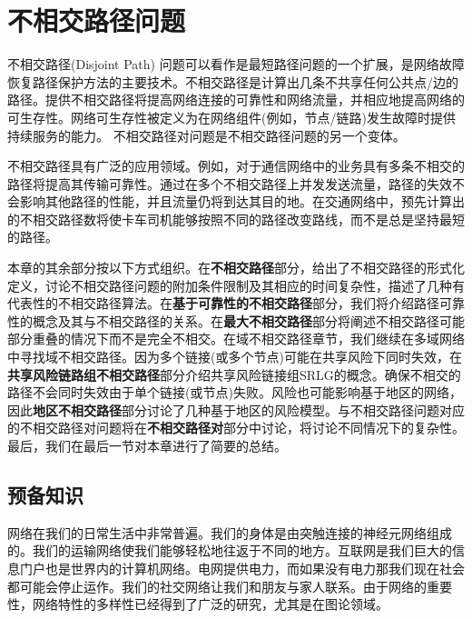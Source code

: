 \chapter{不相交路径问题}


不相交路径(Disjoint Path) 问题可以看作是最短路径问题的一个扩展，是网络故障恢复路径保护方法的主要技术。不相交路径是计算出几条不共享任何公共点/边的路径。提供不相交路径将提高网络连接的可靠性和网络流量，并相应地提高网络的可生存性。网络可生存性被定义为在网络组件(例如，节点/链路)发生故障时提供持续服务的能力\cite{zhou2000survivability}。 不相交路径对问题是不相交路径问题的另一个变体。

不相交路径具有广泛的应用领域。例如，对于通信网络中的业务具有多条不相交的路径将提高其传输可靠性。通过在多个不相交路径上并发发送流量，路径的失效不会影响其他路径的性能，并且流量仍将到达其目的地。在交通网络中，预先计算出的不相交路径数将使卡车司机能够按照不同的路径改变路线，而不是总是坚持最短的路径。


本章的其余部分按以下方式组织。在\textbf{不相交路径}部分，给出了不相交路径的形式化定义，讨论不相交路径问题的附加条件限制及其相应的时间复杂性，描述了几种有代表性的不相交路径算法。在\textbf{基于可靠性的不相交路径}部分，我们将介绍路径可靠性的概念及其与不相交路径的关系。在\textbf{最大不相交路径}部分将阐述不相交路径可能部分重叠的情况下而不是完全不相交。在域不相交路径章节，我们继续在多域网络中寻找域不相交路径。因为多个链接(或多个节点)可能在共享风险下同时失效，在\textbf{共享风险链路组不相交路径}部分介绍共享风险链接组SRLG的概念。确保不相交的路径不会同时失效由于单个链接(或节点)失败。风险也可能影响基于地区的网络，因此\textbf{地区不相交路径}部分讨论了几种基于地区的风险模型。与不相交路径问题对应的不相交路径对问题将在\textbf{不相交路径对}部分中讨论，将讨论不同情况下的复杂性。最后，我们在最后一节对本章进行了简要的总结。

\section{预备知识}
网络在我们的日常生活中非常普遍。我们的身体是由突触连接的神经元网络组成的。我们的运输网络使我们能够轻松地往返于不同的地方。互联网是我们巨大的信息门户也是世界内的计算机网络。电网提供电力，而如果没有电力那我们现在社会都可能会停止运作。我们的社交网络让我们和朋友与家人联系。由于网络的重要性，网络特性的多样性已经得到了广泛的研究，尤其是在图论领域。

